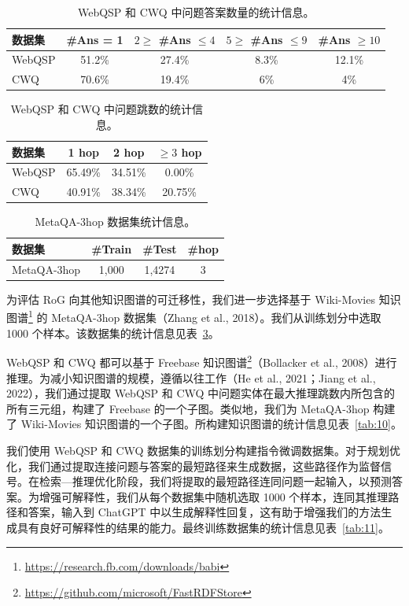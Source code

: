 \documentclass[11pt,UTF8,fontset=fandol]{ctexart}
\begin{document}
\begin{table}[H]
\centering
\caption{WebQSP 和 CWQ 中问题答案数量的统计信息。}
\label{tab:7}
\begin{tabular}{lcccc}
\toprule
数据集 & \#Ans = 1 & $2 \geq$ \#Ans $\leq 4$ & $5 \geq$ \#Ans $\leq 9$ & \#Ans $\geq 10$ \\
\midrule
WebQSP & 51.2\% & 27.4\% & 8.3\% & 12.1\% \\
CWQ    & 70.6\% & 19.4\% & 6\%   & 4\% \\
\bottomrule
\end{tabular}
\end{table}

\begin{table}[H]
\centering
\caption{WebQSP 和 CWQ 中问题跳数的统计信息。}
\label{tab:8}
\begin{tabular}{lccc}
\toprule
数据集 & 1 hop & 2 hop & $\geq 3$ hop \\
\midrule
WebQSP & 65.49\% & 34.51\% & 0.00\% \\
CWQ    & 40.91\% & 38.34\% & 20.75\% \\
\bottomrule
\end{tabular}
\end{table}

\begin{table}[H]
\centering
\caption{MetaQA-3hop 数据集统计信息。}
\label{tab:9}
\begin{tabular}{lccc}
\toprule
数据集 & \#Train & \#Test & \#hop \\
\midrule
MetaQA-3hop & 1,000 & 1,4274 & 3 \\
\bottomrule
\end{tabular}
\end{table}

为评估 RoG 向其他知识图谱的可迁移性，我们进一步选择基于 Wiki-Movies 知识图谱\footnote{\url{https://research.fb.com/downloads/babi}} 的 MetaQA-3hop 数据集（Zhang et al., 2018）。我们从训练划分中选取 1000 个样本。该数据集的统计信息见表~\ref{tab:9}。

WebQSP 和 CWQ 都可以基于 Freebase 知识图谱\footnote{\url{https://github.com/microsoft/FastRDFStore}}（Bollacker et al., 2008）进行推理。为减小知识图谱的规模，遵循以往工作（He et al., 2021；Jiang et al., 2022），我们通过提取 WebQSP 和 CWQ 中问题实体在最大推理跳数内所包含的所有三元组，构建了 Freebase 的一个子图。类似地，我们为 MetaQA-3hop 构建了 Wiki-Movies 知识图谱的一个子图。所构建知识图谱的统计信息见表~\ref{tab:10}。

我们使用 WebQSP 和 CWQ 数据集的训练划分构建指令微调数据集。对于规划优化，我们通过提取连接问题与答案的最短路径来生成数据，这些路径作为监督信号。在检索—推理优化阶段，我们将提取的最短路径连同问题一起输入，以预测答案。为增强可解释性，我们从每个数据集中随机选取 1000 个样本，连同其推理路径和答案，输入到 ChatGPT 中以生成解释性回复，这有助于增强我们的方法生成具有良好可解释性的结果的能力。最终训练数据集的统计信息见表~\ref{tab:11}。
\end{document}
